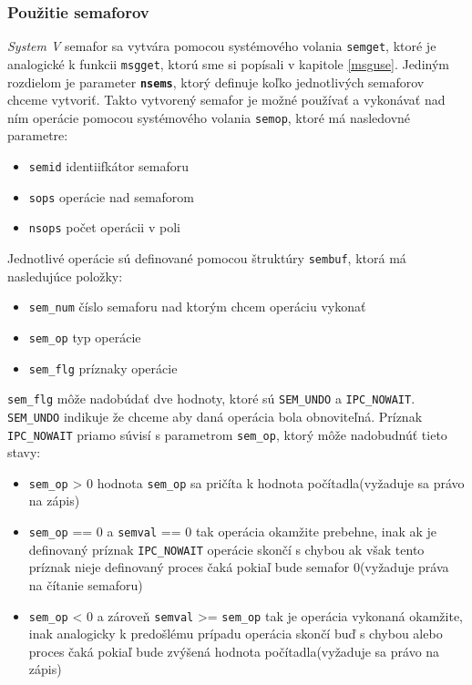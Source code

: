 \subsubsection{Použitie semaforov} \label{smaforuse}
\textit{System V} semafor sa vytvára pomocou systémového volania \texttt{semget}, ktoré je analogické k funkcii \texttt{msgget}, ktorú sme si popísali v kapitole \ref{msguse}. Jediným rozdielom je parameter \textbf{\texttt{nsems}}, ktorý definuje koľko jednotlivých semaforov chceme vytvoriť.\cite{semget}
Takto vytvorený semafor je možné používať a vykonávať nad ním operácie pomocou systémového volania \texttt{semop}, ktoré má nasledovné parametre:
\begin{itemize}
\item \texttt{semid} identiifkátor semaforu
\item \texttt{sops} operácie nad semaforom
\item \texttt{nsops} počet operácii v poli
\end{itemize}
Jednotlivé operácie sú definované pomocou štruktúry \texttt{sembuf}, ktorá má nasledujúce položky:
\begin{itemize}
\item \texttt{sem\_num} číslo semaforu nad ktorým chcem operáciu vykonať
\item \texttt{sem\_op} typ operácie
\item \texttt{sem\_flg} príznaky operácie
\end{itemize}
\texttt{sem\_flg} môže nadobúdať dve hodnoty, ktoré sú \texttt{SEM\_UNDO} a \texttt{IPC\_NOWAIT}. \texttt{SEM\_UNDO} indikuje že chceme aby daná operácia bola obnoviteľná. Príznak \texttt{IPC\_NOWAIT} priamo súvisí s parametrom \texttt{sem\_op}, ktorý môže nadobudnúť tieto stavy\cite{semop}:
\begin{itemize}
\item \texttt{sem\_op} > 0 hodnota \texttt{sem\_op} sa pričíta k hodnota počítadla(vyžaduje sa právo na zápis)
\item \texttt{sem\_op} == 0 a \texttt{semval} == 0 tak operácia okamžite prebehne, inak ak je definovaný príznak \texttt{IPC\_NOWAIT} operácie skončí s chybou ak však tento príznak nieje definovaný proces čaká pokiaľ bude semafor 0(vyžaduje práva na čítanie semaforu)
\item \texttt{sem\_op} < 0 a zároveň \texttt{semval} >= \texttt{sem\_op} tak je operácia vykonaná okamžite, inak analogicky k predošlému prípadu operácia skončí buď s chybou alebo proces čaká pokiaľ bude zvýšená hodnota počítadla(vyžaduje sa právo na zápis)
\end{itemize}
